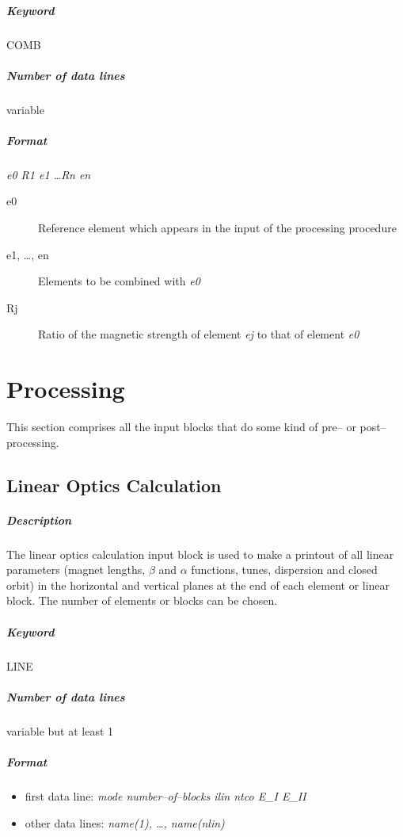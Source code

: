 \subparagraph{Keyword} COMB \subparagraph{Number of data lines}
variable

\subparagraph{Format} {\em e0 R1 e1 \dots Rn en}

\begin{description}
\item [e0] Reference element which appears in the input of the
  processing procedure
\item [e1, \dots, en] Elements to be combined with {\em e0}
\item [Rj] Ratio of the magnetic strength of element {\em ej} \/to
  that of element {\em e0}
\end{description}

\section{Processing}

This section comprises all the input blocks that do some kind of pre--
or post--processing.

\subsection{Linear Optics Calculation} \label{LinOpt}

\subparagraph{Description} The linear optics calculation input block
is used to make a printout of all linear parameters (magnet lengths,
$\beta$ and $\alpha$ functions, tunes, dispersion and closed orbit) in
the horizontal and vertical planes at the end of each element or
linear block.  The number of elements or blocks can be chosen.

\subparagraph{Keyword} LINE \subparagraph{Number of data lines}
variable but at least 1

\subparagraph{Format}
\begin{itemize}
\item first data line: {\em mode number--of--blocks ilin ntco E\_I E\_II}
\item other data lines: {\em name(1), \dots , name(nlin)}
\end{itemize}


